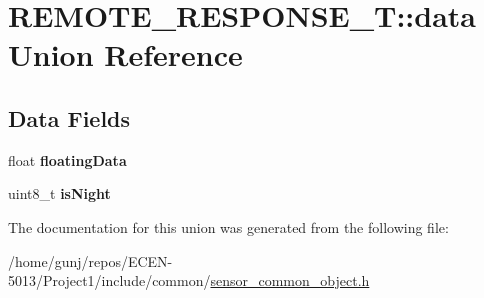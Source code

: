 \hypertarget{unionREMOTE__RESPONSE__T_1_1data}{}\section{R\+E\+M\+O\+T\+E\+\_\+\+R\+E\+S\+P\+O\+N\+S\+E\+\_\+T\+:\+:data Union Reference}
\label{unionREMOTE__RESPONSE__T_1_1data}
\subsection*{Data Fields}
\begin{DoxyCompactItemize}
\item 
float {\bfseries floating\+Data}\hypertarget{unionREMOTE__RESPONSE__T_1_1data_ae2e376d49080e8828ed00fb9ff1b5f63}{}\label{unionREMOTE__RESPONSE__T_1_1data_ae2e376d49080e8828ed00fb9ff1b5f63}

\item 
uint8\+\_\+t {\bfseries is\+Night}\hypertarget{unionREMOTE__RESPONSE__T_1_1data_a9cb654e8e2aa8cbcc234170ba4913e62}{}\label{unionREMOTE__RESPONSE__T_1_1data_a9cb654e8e2aa8cbcc234170ba4913e62}

\end{DoxyCompactItemize}


The documentation for this union was generated from the following file\+:\begin{DoxyCompactItemize}
\item 
/home/gunj/repos/\+E\+C\+E\+N-\/5013/\+Project1/include/common/\hyperlink{sensor__common__object_8h}{sensor\+\_\+common\+\_\+object.\+h}\end{DoxyCompactItemize}
